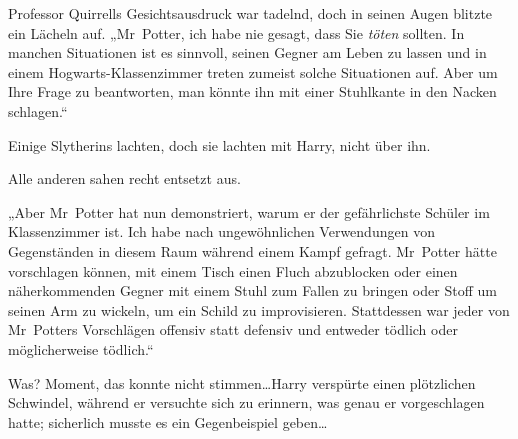 Professor Quirrells Gesichtsausdruck war tadelnd, doch in seinen Augen blitzte ein Lächeln auf. „Mr~Potter, ich habe nie gesagt, dass Sie \emph{töten} sollten. In manchen Situationen ist es sinnvoll, seinen Gegner am Leben zu lassen und in einem Hogwarts-Klassenzimmer treten zumeist solche Situationen auf. Aber um Ihre Frage zu beantworten, man könnte ihn mit einer Stuhlkante in den Nacken schlagen.“

Einige Slytherins lachten, doch sie lachten mit Harry, nicht über ihn.

Alle anderen sahen recht entsetzt aus.

„Aber Mr~Potter hat nun demonstriert, warum er der gefährlichste Schüler im Klassenzimmer ist. Ich habe nach ungewöhnlichen Verwendungen von Gegenständen in diesem Raum während einem Kampf gefragt. Mr~Potter hätte vorschlagen können, mit einem Tisch einen Fluch abzublocken oder einen näherkommenden Gegner mit einem Stuhl zum Fallen zu bringen oder Stoff um seinen Arm zu wickeln, um ein Schild zu improvisieren. Stattdessen war jeder von Mr~Potters Vorschlägen offensiv statt defensiv und entweder tödlich oder möglicherweise tödlich.“

Was? Moment, das konnte nicht stimmen…Harry verspürte einen plötzlichen Schwindel, während er versuchte sich zu erinnern, was genau er vorgeschlagen hatte; sicherlich musste es ein Gegenbeispiel geben…

